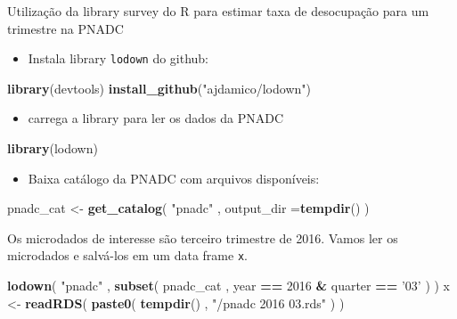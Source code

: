 \documentclass[]{book}
\newenvironment{Shaded}{\begin{snugshade}}{\end{snugshade}}
\newcommand{\KeywordTok}[1]{\textcolor[rgb]{0.13,0.29,0.53}{\textbf{#1}}}
\newcommand{\DataTypeTok}[1]{\textcolor[rgb]{0.13,0.29,0.53}{#1}}
\newcommand{\DecValTok}[1]{\textcolor[rgb]{0.00,0.00,0.81}{#1}}
\newcommand{\StringTok}[1]{\textcolor[rgb]{0.31,0.60,0.02}{#1}}
\newcommand{\OperatorTok}[1]{\textcolor[rgb]{0.81,0.36,0.00}{\textbf{#1}}}
\newcommand{\NormalTok}[1]{#1}
\providecommand{\tightlist}{%
  \setlength{\itemsep}{0pt}\setlength{\parskip}{0pt}}
\theoremstyle{definition}
\theoremstyle{definition}
\theoremstyle{definition}
\theoremstyle{remark}
\let\BeginKnitrBlock\begin \let\EndKnitrBlock\end
\begin{document}
\BeginKnitrBlock{example}
\protect\hypertarget{exm:exe14}{}{\label{exm:exe14} }Utilização da library
survey do R para estimar taxa de desocupação para um trimestre na PNADC
\EndKnitrBlock{example}

\begin{itemize}
\tightlist
\item
  Instala library \texttt{lodown} \citep{R-lodown} do github:
\end{itemize}

\begin{Shaded}
\begin{Highlighting}[]
\KeywordTok{library}\NormalTok{(devtools)}
\KeywordTok{install_github}\NormalTok{(}\StringTok{"ajdamico/lodown"}\NormalTok{)}
\end{Highlighting}
\end{Shaded}

\begin{itemize}
\tightlist
\item
  carrega a library para ler os dados da PNADC
\end{itemize}

\begin{Shaded}
\begin{Highlighting}[]
\KeywordTok{library}\NormalTok{(lodown)}
\end{Highlighting}
\end{Shaded}

\begin{itemize}
\tightlist
\item
  Baixa catálogo da PNADC com arquivos disponíveis:
\end{itemize}

\begin{Shaded}
\begin{Highlighting}[]
\NormalTok{pnadc_cat <-}\StringTok{ }\KeywordTok{get_catalog}\NormalTok{( }\StringTok{"pnadc"}\NormalTok{ , }\DataTypeTok{output_dir =}\KeywordTok{tempdir}\NormalTok{() )}
\end{Highlighting}
\end{Shaded}

Os microdados de interesse são terceiro trimestre de 2016. Vamos ler os
microdados e salvá-los em um data frame \texttt{x}.

\begin{Shaded}
\begin{Highlighting}[]
\KeywordTok{lodown}\NormalTok{( }\StringTok{"pnadc"}\NormalTok{ , }\KeywordTok{subset}\NormalTok{( pnadc_cat , year }\OperatorTok{==}\StringTok{ }\DecValTok{2016} \OperatorTok{&}\StringTok{ }\NormalTok{quarter }\OperatorTok{==}\StringTok{ '03'}\NormalTok{ ) )}
\NormalTok{x <-}\StringTok{ }\KeywordTok{readRDS}\NormalTok{( }\KeywordTok{paste0}\NormalTok{( }\KeywordTok{tempdir}\NormalTok{() , }\StringTok{"/pnadc 2016 03.rds"}\NormalTok{ ) )}
\end{Highlighting}
\end{Shaded}
\end{document}
